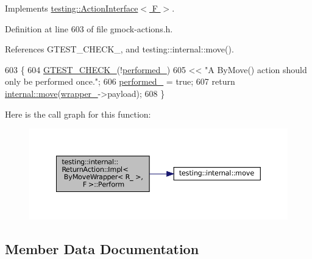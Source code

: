 Implements \hyperlink{classtesting_1_1ActionInterface_a20f8624fcea1786f2992b358760422a0}{testing\+::\+Action\+Interface$<$ F $>$}.



Definition at line 603 of file gmock-\/actions.\+h.



References G\+T\+E\+S\+T\+\_\+\+C\+H\+E\+C\+K\+\_\+, and testing\+::internal\+::move().


\begin{DoxyCode}
603                                                  \{
604       \hyperlink{gtest-port_8h_ab54343f0a36dc4cb0ce8a478dd7847b8}{GTEST\_CHECK\_}(!\hyperlink{classtesting_1_1internal_1_1ReturnAction_1_1Impl_3_01ByMoveWrapper_3_01R___01_4_00_01F_01_4_adb9db786f4a87a4a8a055ddc840f9d77}{performed\_})
605           << \textcolor{stringliteral}{"A ByMove() action should only be performed once."};
606       \hyperlink{classtesting_1_1internal_1_1ReturnAction_1_1Impl_3_01ByMoveWrapper_3_01R___01_4_00_01F_01_4_adb9db786f4a87a4a8a055ddc840f9d77}{performed\_} = \textcolor{keyword}{true};
607       \textcolor{keywordflow}{return} \hyperlink{namespacetesting_1_1internal_a0f6d06bf8c3093b9c22bb08723db201e}{internal::move}(\hyperlink{classtesting_1_1internal_1_1ReturnAction_1_1Impl_3_01ByMoveWrapper_3_01R___01_4_00_01F_01_4_a8ff130e32f8b90238cdbf7d62fe99de1}{wrapper\_}->payload);
608     \}
\end{DoxyCode}
Here is the call graph for this function\+:
\nopagebreak
\begin{figure}[H]
\begin{center}
\leavevmode
\includegraphics[width=350pt]{classtesting_1_1internal_1_1ReturnAction_1_1Impl_3_01ByMoveWrapper_3_01R___01_4_00_01F_01_4_a4f6e45f593abffb7a8b26cebfc4a0262_cgraph}
\end{center}
\end{figure}


\subsection{Member Data Documentation}
\mbox{\label{classtesting_1_1internal_1_1ReturnAction_1_1Impl_3_01ByMoveWrapper_3_01R___01_4_00_01F_01_4_adb9db786f4a87a4a8a055ddc840f9d77}} 
